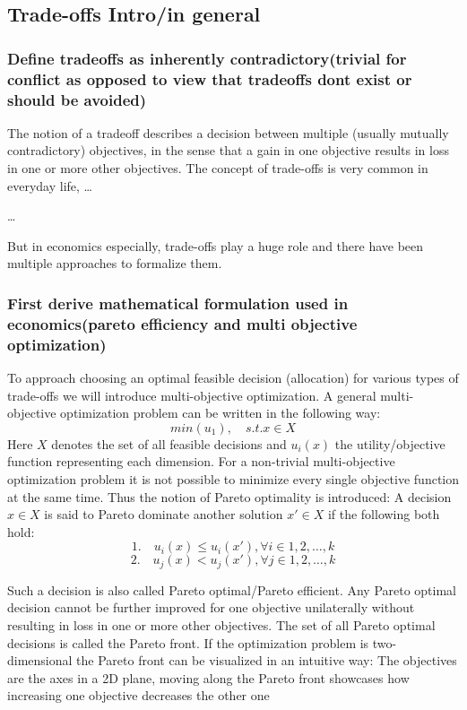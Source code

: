 \subsection{Trade-offs Intro/in general}
	\subsubsection{Define tradeoffs as  inherently contradictory(trivial for conflict as opposed to view that tradeoffs dont exist or should be avoided)}


	The notion of a tradeoff describes a decision between multiple (usually mutually contradictory) objectives, in the sense that a gain in one objective results in loss in one or more other objectives.
	The concept of trade-offs is very common in everyday life, \dots

	\dots
	
	But in economics especially, trade-offs play a huge role and there have been multiple approaches to formalize them.

	\subsubsection{First derive mathematical formulation used in economics(pareto efficiency and multi objective optimization)}

	To approach choosing an optimal feasible decision (allocation) for various types of trade-offs we will introduce multi-objective optimization.
	A general multi-objective optimization problem can be written in the following way:
	$$min(u_1), \quad s.t. x\in X$$
	Here $X$ denotes the set of all feasible decisions and $u_i(x)$ the utility/objective function representing each dimension.
	For a non-trivial multi-objective optimization problem it is not possible to minimize every single objective function at the same time.
	Thus the notion of Pareto optimality is introduced:
	A decision $x\in X$ is said to Pareto dominate another solution $x'\in X$ if the following both hold:
	$$1.\quad u_i(x)\le u_i(x'), \forall i\in {1,2,\dots,k}$$
	$$2. \quad u_j(x) < u_j(x'), \forall j\in {1,2,\dots,k}$$

	Such a decision is also called Pareto optimal/Pareto efficient.
	Any Pareto optimal decision cannot be further improved for one objective unilaterally without resulting in loss in one or more other objectives.
	The set of all Pareto optimal decisions is called the Pareto front.
	If the optimization problem is two-dimensional the Pareto front can be visualized in an intuitive way:
	The objectives are the axes in a 2D plane, moving along the Pareto front showcases how increasing one objective decreases the other one

